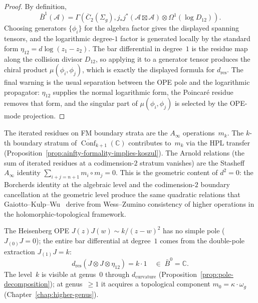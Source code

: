 \begin{proof}
By definition,
\[
\bar B^1(\mathcal A)
=
\Gamma\!\left(\overline C_2(\Sigma_g),
j_*j^*(\mathcal A\boxtimes\mathcal A)\otimes\Omega^1(\log D_{12})\right).
\]
Choosing generators \(\{\phi_i\}\) for the algebra factor gives the
displayed spanning tensors, and the logarithmic degree-$1$ factor is
generated locally by the standard form
\(\eta_{12}=d\log(z_1-z_2)\).
The bar differential in degree~$1$ is the residue map along the collision
divisor \(D_{12}\), so applying it to a generator tensor produces the
chiral product \(\mu(\phi_i,\phi_j)\), which is exactly the displayed
formula for \(d_{\mathrm{res}}\). The final warning is the usual
separation between the OPE pole and the logarithmic propagator:
\(\eta_{12}\) supplies the normal logarithmic form, the Poincar\'e
residue removes that form, and the singular part of
\(\mu(\phi_i,\phi_j)\) is selected by the OPE-mode projection.
\end{proof}

\begin{remark}
\label{rem:iterated-residues-ainfty}
The iterated residues on FM boundary strata are the $A_\infty$
operations~$m_k$. The $k$-th boundary stratum of
$\overline{\operatorname{Conf}}_{k+1}(\mathbb{C})$ contributes to~$m_k$
via the HPL transfer
(Proposition~\ref{prop:ainfty-formality-implies-koszul}).
The Arnold relations (the sum of iterated residues at a
codimension-$2$ stratum vanishes) are the Stasheff $A_\infty$
identity $\sum_{i+j=n+1} m_i \circ m_j = 0$.
This is the geometric content of $d^2 = 0$: the Borcherds identity
at the algebraic level and the codimension-$2$ boundary cancellation
at the geometric level produce the same quadratic relations that
Gaiotto--Kulp--Wu~\cite{GKW2025} derive from Wess--Zumino
consistency of higher operations in the holomorphic-topological
framework.
\end{remark}

\begin{example}\label{ex:heisenberg-deg1-complete}
The Heisenberg OPE $J(z)J(w) \sim k/(z{-}w)^2$ has no simple pole
($J_{(0)}J = 0$); the entire bar differential at degree~$1$ comes
from the double-pole extraction $J_{(1)}J = k$:
\[
d_{\mathrm{res}}(J \otimes J \otimes \eta_{12}) = k \cdot 1
\quad\in\; \bar{B}^0 = \mathbb{C}.
\]
The level~$k$ is visible at genus~$0$ through
$d_{\mathrm{curvature}}$
(Proposition~\ref{prop:pole-decomposition});
at genus~$\geq 1$ it acquires a topological component
$m_0 = \kappa \cdot \omega_g$
(Chapter~\ref{chap:higher-genus}).
\end{example}


